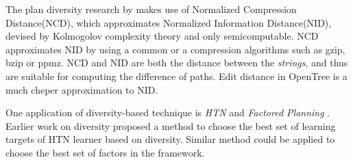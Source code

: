 The plan diversity research by \cite{goldman2015measuring} makes use of Normalized Compression Distance(NCD), which approximates Normalized Information Distance(NID), devised by Kolmogolov complexity theory and only semicomputable. NCD approximates NID by using a common or a \sota compression algorithms such as gzip, bzip or ppmz. NCD and NID are both the distance between the  \emph{strings}, and thus are suitable for computing the difference of paths. Edit distance in OpenTree is a much cheper approximation to NID.

One application of diversity-based technique is \emph{HTN} \cite{erol1994} and \emph{Factored Planning} \cite{amir2003factored,brafman2006factored,Asai2015}. Earlier work on diversity \cite{goldman2015measuring} proposed a method to choose the best set of learning targets of HTN learner based on diversity. Similar method could be applied to choose the best set of factors in the framework.
